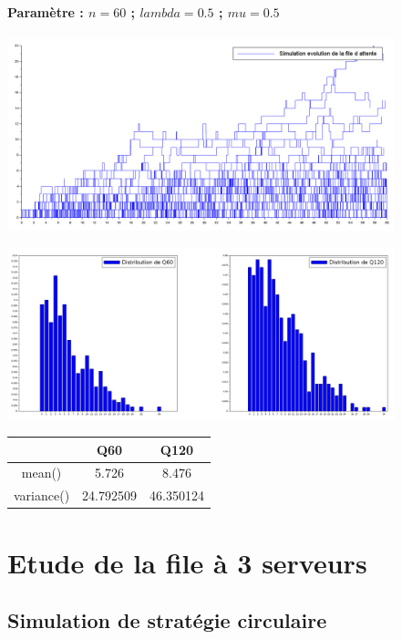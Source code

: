 \documentclass{article}
\begin{document}
\paragraph{Paramètre : $n=60$ ; $lambda=0.5$ ; $mu=0.5$}
\begin{center}
	\includegraphics[width=425px]{img/egal.PNG}
\end{center}
\begin{center}
	\includegraphics[width=425px]{img/egal/dist.png}
\end{center}
\begin{center}
	\begin{tabular}{c|cc}
		\hline \hline
		& Q60 & Q120 \\
		\hline 
		mean() & 5.726 & 8.476 \\
		variance() & 24.792509 & 46.350124 \\
		\hline \hline
	\end{tabular}
\end{center}


\section{Etude de la file à 3 serveurs}

\subsection{Simulation de stratégie circulaire}
\end{document}
